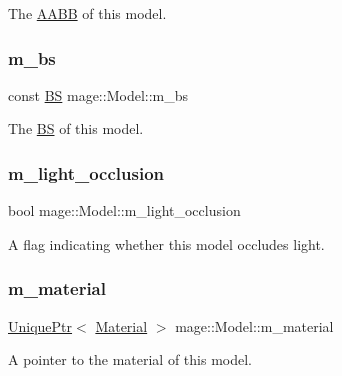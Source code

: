 The \hyperlink{structmage_1_1_a_a_b_b}{A\+A\+BB} of this model. \hypertarget{classmage_1_1_model_a1d3ea0a9f302f623dcaceb2df4315a0b}{}\label{classmage_1_1_model_a1d3ea0a9f302f623dcaceb2df4315a0b} 
\subsubsection{\texorpdfstring{m\+\_\+bs}{m\_bs}}
{\footnotesize\ttfamily const \hyperlink{structmage_1_1_b_s}{BS} mage\+::\+Model\+::m\+\_\+bs\hspace{0.3cm}{\ttfamily [private]}}

The \hyperlink{structmage_1_1_b_s}{BS} of this model. \hypertarget{classmage_1_1_model_af6e1183a2f2147b7848aa10010bdfcd3}{}\label{classmage_1_1_model_af6e1183a2f2147b7848aa10010bdfcd3} 
\subsubsection{\texorpdfstring{m\+\_\+light\+\_\+occlusion}{m\_light\_occlusion}}
{\footnotesize\ttfamily bool mage\+::\+Model\+::m\+\_\+light\+\_\+occlusion\hspace{0.3cm}{\ttfamily [private]}}

A flag indicating whether this model occludes light. \hypertarget{classmage_1_1_model_a88d97cd87b7ef37130f7a4007477698a}{}\label{classmage_1_1_model_a88d97cd87b7ef37130f7a4007477698a} 
\subsubsection{\texorpdfstring{m\+\_\+material}{m\_material}}
{\footnotesize\ttfamily \hyperlink{namespacemage_a3316d7143a973e37adf1110f2e80ca31}{Unique\+Ptr}$<$ \hyperlink{classmage_1_1_material}{Material} $>$ mage\+::\+Model\+::m\+\_\+material\hspace{0.3cm}{\ttfamily [private]}}

A pointer to the material of this model. \hypertarget{classmage_1_1_model_aecd2b4031c5df30fb5f7ed6d62810f73}{}\label{classmage_1_1_model_aecd2b4031c5df30fb5f7ed6d62810f73} 
